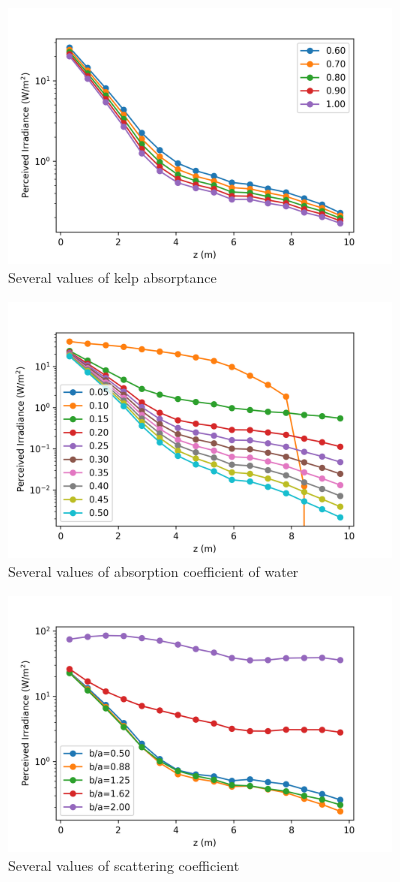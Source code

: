 \documentclass[ms,cpyr,lof,lot]{uathesis}
\begin{document}
\begin{figure}[H]
  \centering
  \includegraphics[width=4in]{sens_analysis_absorptance_kelp}
  \caption{Several values of kelp absorptance}
\end{figure}

\begin{figure}[H]
  \centering
  \includegraphics[width=4in]{sens_analysis_a_water}
  \caption{Several values of absorption coefficient of water}
  \label{fig:sens_analysis_a_water}
\end{figure}

\begin{figure}[H]
  \centering
  \includegraphics[width=4in]{sens_analysis_b}
  \caption{Several values of scattering coefficient}
  \label{fig:sens_analysis_b}
\end{figure}
\end{document}
